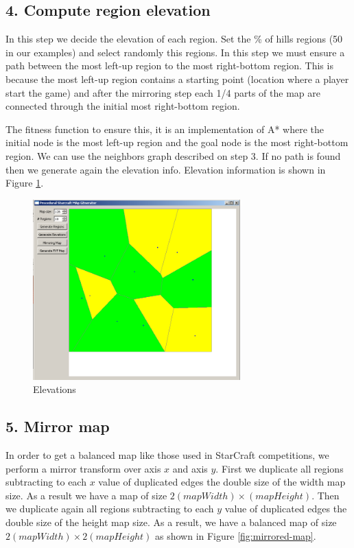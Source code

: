\documentclass[letterpaper]{article}
\begin{document}
\subsection{4. Compute region elevation}
In this step we decide the elevation of each region. Set the \% of hills regions (50 in our examples) and select randomly this regions. In this step we must ensure a path between the most left-up region to the most right-bottom region. This is because the most left-up region contains a starting point (location where a player start the game) and after the mirroring step each 1/4 parts of the map are connected through the initial most right-bottom region.

The fitness function to ensure this, it is an implementation of A* where the initial node is the most left-up region and the goal node is the most right-bottom region. We can use the neighbors graph described on step 3. If no path is found then we generate again the elevation info. Elevation information is shown in Figure \ref{fig:elevations}.

\begin{figure}[ht]
    \centering
    \includegraphics[width=8cm]{PCG03.png}
    \caption{Elevations}
    \label{fig:elevations}
\end{figure}

\subsection{5. Mirror map}
In order to get a balanced map like those used in StarCraft competitions, we perform a mirror transform over axis $x$ and axis $y$. First we duplicate all regions subtracting to each $x$ value of duplicated edges the double size of the width map size. As a result we have a map of size $2(mapWidth) \times (mapHeight)$. Then we duplicate again all regions subtracting to each $y$ value of duplicated edges the double size of the height map size. As a result, we have a balanced map of size $2(mapWidth)  \times 2(mapHeight)$ as shown in Figure \ref{fig:mirrored-map}.
\end{document}
